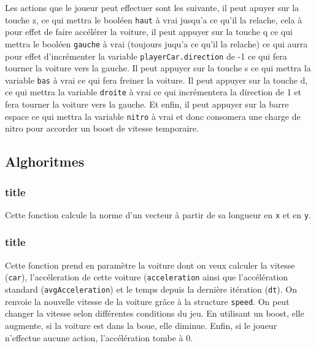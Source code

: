 \documentclass[11pt]{report}
\renewcommand{\tt}[1]{\texttt{#1}}
\begin{document}


Les actions que le joueur peut effectuer sont les suivante, il peut apuyer sur la touche z, ce qui mettra le booléen \tt{haut} à vrai jusqu'a ce qu'il la relache, cela à pour effet de faire accélérer la voiture, il peut appuyer sur la touche q ce qui mettra le booléen \tt{gauche} à vrai (toujours juqu'a ce qu'il la relache) ce qui aurra pour effet d'incrémenter la variable \tt{playerCar.direction} de -1 ce qui fera tourner la voiture vers la gauche.
Il peut appuyer sur la touche s ce qui mettra la variable \tt{bas} à vrai ce qui fera freiner la voiture. Il peut appuyer sur la touche d, ce qui mettra la variable \tt{droite} à vrai ce qui incrémentera la direction de 1 et fera tourner la voiture vers la gauche.
Et enfin, il peut appuyer sur la barre espace ce qui mettra la variable \tt{nitro} à vrai et donc consomera une charge de nitro pour accorder un boost de vitesse temporaire.

\subsection{Alghoritmes}

\subsubsection{title}



Cette fonction calcule la norme d'un vecteur à partir de sa longueur en \tt{x} et en \tt{y}.

\subsubsection{title}



Cette fonction prend en paramètre la voiture dont on veux calculer la vitesse (\tt{car}), l'accéleration de cette voiture (\tt{acceleration} ainsi que l'accélération standard (\tt{avgAcceleration}) et le temps depuis la dernière itération (\tt{dt}). On renvoie la nouvelle vitesse de la voiture grâce à la structure \tt{speed}. On peut changer la vitesse selon différentes conditions du jeu. En utilisant un boost, elle augmente, si la voiture est dans la boue, elle diminue. Enfin, si le joueur n'effectue aucune action, l'accélération tombe à 0.
\end{document}
